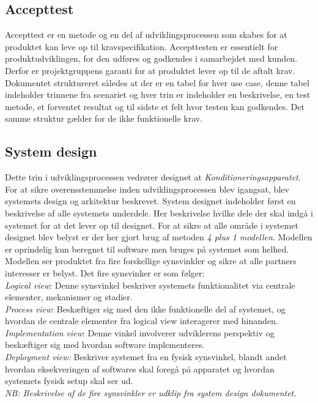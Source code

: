 	\subsection{Accepttest} \label{title:accepttest}
	Accepttest er en metode og en del af udviklingsprocessen som skabes for at produktet kan leve op til kravspecifikation. Accepttesten er essentielt for produktudviklingen, for den udføres og godkendes i samarbejdet med kunden. Derfor er projektgruppens garanti for at produktet lever op til de aftalt krav. 
	Dokumentet struktureret således at der er en tabel for hver use case, denne tabel indeholder trinnene fra scenariet og hver trin er indeholder en beskrivelse, en test metode, et forventet resultat og til sidste et felt hvor testen kan godkendes. Det samme struktur gælder for de ikke funktionelle krav. 
	
	\subsection{System design} \label{title:systemdesign}
	Dette trin i udviklingsprocessen vedrører designet at \textit{Konditioneringsapparatet}. For at sikre overensstemmelse inden udviklingsprocessen blev igangsat, blev systemets design og arkitektur beskrevet. System designet indeholder først en beskrivelse af alle systemets underdele. Her beskrivelse hvilke dele der skal indgå i systemet for at det lever op til designet.
	For at sikre at alle område i systemet designet blev belyst er der her gjort brug af metoden \textit{4 plus 1 modellen}. Modellen er oprindelig kun beregnet til software men bruges på systemet som helhed. Modellen ser produktet fra fire forskellige synsvinkler og sikre at alle partners interesser er belyst. Det fire synsvinker er som følger: 
	\\ \textit{Logical view}: Denne synsvinkel beskriver systemets funktionalitet via centrale elementer, mekanismer og stadier. \\
	\textit{Process view}: Beskæftiger sig med den ikke funktionelle del af systemet, og hvordan de centrale elementer fra logical view interagerer med hinanden. \\
	\textit{Implementation view}: Denne vinkel involverer udviklerens perspektiv og beskæftiger sig med hvordan software implementeres. \\
	\textit{Deployment view:} Beskriver systemet fra en fysisk synsvinkel, blandt andet hvordan eksekveringen af softwares skal foregå på apparatet og hvordan systemets fysisk setup skal ser ud. \\
	\textit{NB: Beskrivelse af de fire synsvinkler er udklip fra system design dokumentet.} 
	
